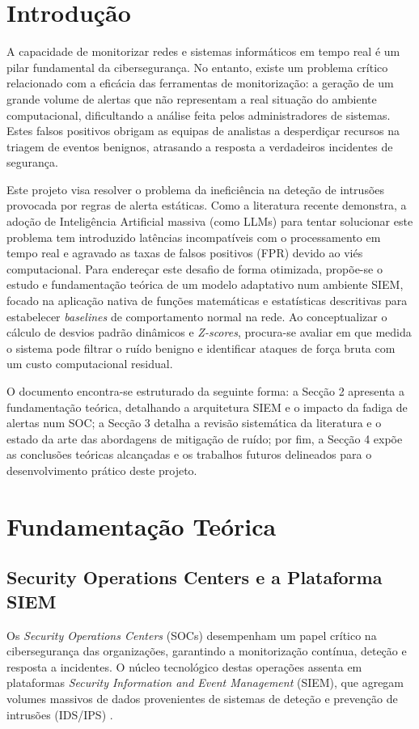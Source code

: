 \documentclass[12pt,a4paper]{article}
\begin{document}
\section{Introdução}
A capacidade de monitorizar redes e sistemas informáticos em tempo real é um pilar fundamental da cibersegurança. No entanto, existe um problema crítico relacionado com a eficácia das ferramentas de monitorização: a geração de um grande volume de alertas que não representam a real situação do ambiente computacional, dificultando a análise feita pelos administradores de sistemas. Estes falsos positivos obrigam as equipas de analistas a desperdiçar recursos na triagem de eventos benignos, atrasando a resposta a verdadeiros incidentes de segurança.

Este projeto visa resolver o problema da ineficiência na deteção de intrusões provocada por regras de alerta estáticas. Como a literatura recente demonstra, a adoção de Inteligência Artificial massiva (como LLMs) para tentar solucionar este problema tem introduzido latências incompatíveis com o processamento em tempo real e agravado as taxas de falsos positivos (FPR) devido ao viés computacional. Para endereçar este desafio de forma otimizada, propõe-se o estudo e fundamentação teórica de um modelo adaptativo num ambiente SIEM, focado na aplicação nativa de funções matemáticas e estatísticas descritivas para estabelecer \textit{baselines} de comportamento normal na rede. Ao conceptualizar o cálculo de desvios padrão dinâmicos e \textit{Z-scores}, procura-se avaliar em que medida o sistema pode filtrar o ruído benigno e identificar ataques de força bruta com um custo computacional residual.

O documento encontra-se estruturado da seguinte forma: a Secção 2 apresenta a fundamentação teórica, detalhando a arquitetura SIEM e o impacto da fadiga de alertas num SOC; a Secção 3 detalha a revisão sistemática da literatura e o estado da arte das abordagens de mitigação de ruído; por fim, a Secção 4 expõe as conclusões teóricas alcançadas e os trabalhos futuros delineados para o desenvolvimento prático deste projeto.

\newpage

\section{Fundamentação Teórica}
\subsection{Security Operations Centers e a Plataforma SIEM}
Os \textit{Security Operations Centers} (SOCs) desempenham um papel crítico na cibersegurança das organizações, garantindo a monitorização contínua, deteção e resposta a incidentes. O núcleo tecnológico destas operações assenta em plataformas \textit{Security Information and Event Management} (SIEM), que agregam volumes massivos de dados provenientes de sistemas de deteção e prevenção de intrusões (IDS/IPS) \cite{roy2026}. 
\end{document}
